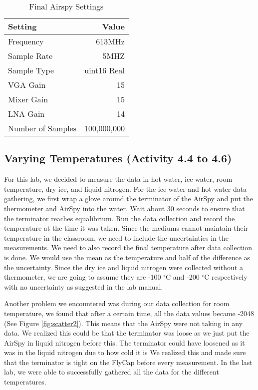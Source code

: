 \documentclass[10pt, preprint]{aastex}
\begin{document}
\begin{table}[H]
\centering
\footnotesize
\begin{tabular}{lr}
\hline
Setting & Value\\\hline
Frequency&613MHz\\
Sample Rate & 5MHZ\\
Sample Type & uint16 Real\\
VGA Gain & 15\\
Mixer Gain & 15\\
LNA Gain & 14\\
Number of Samples & 100,000,000\\
\end{tabular}
\caption{\label{table:AirsySettings2}Final Airspy Settings}
\end{table}

\subsection{Varying Temperatures (Activity 4.4 to 4.6)}

For this lab, we decided to measure the data in hot water, ice water, room temperature, dry ice, and liquid nitrogen. For the ice water and hot water data gathering, we first wrap a glove around the terminator of the AirSpy and put the thermometer and AirSpy into the water. Wait about 30 seconds to ensure that the terminator reaches equalibrium. Run the data collection and record the temperature at the time it was taken. Since the mediums cannot maintain their temperature in the classroom, we need to include the uncertainties in the measurements. We need to also record the final temperature after data collection is done. We would use the mean as the temperature and half of the difference as the uncertainty. Since the dry ice and liquid nitrogen were collected without a thermometer, we are going to assume they are -100 $^\circ\mathrm{C}$ and -200 $^\circ\mathrm{C}$ respectively with no uncertainty as suggested in the lab manual\cite{labmanual}.

Another problem we encountered was during our data collection for room temperature, we found that after a certain time, all the data values became -2048 (See Figure \ref{fig:scatter2}). This means that the AirSpy were not taking in any data. We realized this could be that the terminator was loose as we just put the AirSpy in liquid nitrogen before this. The terminator could have loosened as it was in the liquid nitrogen due to how cold it is We realized this and made sure that the terminator is tight on the FlyCap before every measurement. In the last lab, we were able to successfully gathered all the data for the different temperatures.
\end{document}
